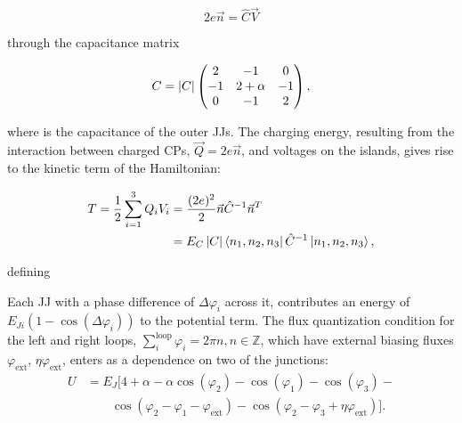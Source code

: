 \begin{equation}
  \label{eq:link}
  2e\vec{n} = \hat{C}\vec{V}
\end{equation}

\noindent through the capacitance matrix

\begin{equation}
  \label{eq:capac}
  C = \left|C\right| \begin{pmatrix}
    2  &  -1  &  0\\
    -1  &  2  +  \alpha  &  -1\\
    0  &  -1  & 2
  \end{pmatrix},
\end{equation}

\noindent  where   is the  capacitance of  the outer  JJs.  The  charging
energy,    resulting    from    the     interaction    between    charged    CPs,
$ \vec{Q}=2e\vec{n}  $, and voltages  on the islands,  gives rise to  the kinetic
term of the Hamiltonian:

\begin{equation}\label{eq:kinetic}
  \begin{aligned}
    T = \frac{1}{2}\sum_{i=1}^{3}Q_iV_i & =
    \frac{(2e)^2}{2}\vec{n}\hat{C}^{-1}\vec{n}^{T}\\
    & =  E_C \left|C\right|  \Bra{n_{1}, n_{2},  n_{3}}{\hat{C}^{-1}}\Ket{n_{1}, n_2,
      n_3},
  \end{aligned}
\end{equation}

\noindent defining 

Each JJ with a  phase difference of $\Delta\varphi_{i}$ across it,  contributes an energy of
$  E_{Ji}\left(1  -  \cos(\Delta\varphi_i)\right)  $   to  the  potential  term.   The  flux
quantization     condition     for     the      left     and     right     loops,
$ \sum_{i}^{\text{loop}}  \varphi_i = 2\pi n,  n \in \mathbb{Z}$, which  have external biasing
fluxes $ \varphi_\text{ext} $, $ \eta\varphi_\text{ext} $,  enters as a dependence on two of the
junctions:
\begin{equation}\label{eq:potential}
  \begin{aligned}
    U & = E_J\big[4 + \alpha - \alpha\cos(\varphi_{2}) -\cos(\varphi_{1}) -\cos(\varphi_{3}) - \\
    &  \qquad   \cos(\varphi_{2}  -  \varphi_{1}  -   \varphi_{\text{ext}})  -  \cos(\varphi_{2}  -   \varphi_{3}  +
    \eta\varphi_{\text{ext}})\big].
  \end{aligned}
\end{equation}

